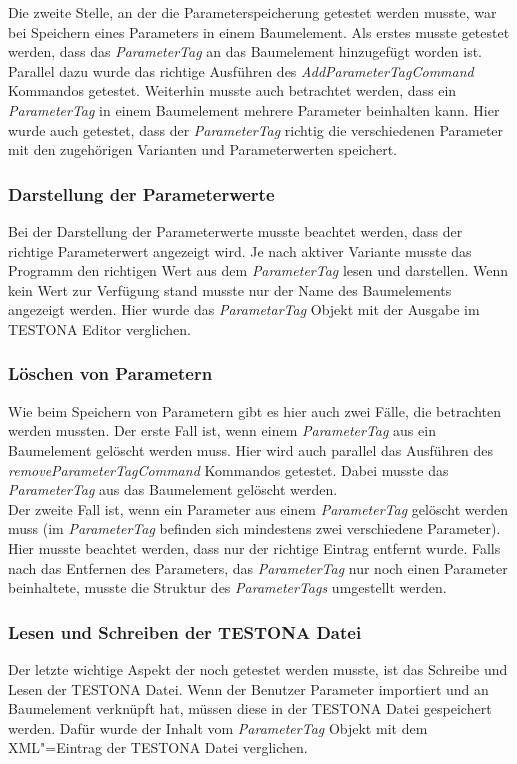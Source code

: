 Die zweite Stelle, an der die Parameterspeicherung getestet werden musste, war bei Speichern eines Parameters in einem Baumelement. Als erstes musste getestet werden, dass das \textit{ParameterTag} an das Baumelement hinzugefügt worden ist. Parallel dazu wurde das richtige Ausführen des \textit{AddParameterTagCommand} Kommandos getestet. Weiterhin musste auch betrachtet werden, dass ein \textit{ParameterTag} in einem Baumelement mehrere Parameter beinhalten kann. Hier wurde auch getestet, dass der \textit{ParameterTag} richtig die verschiedenen Parameter mit den zugehörigen Varianten und Parameterwerten speichert.\\



\subsubsection{Darstellung der Parameterwerte}
Bei der Darstellung der Parameterwerte musste beachtet werden, dass der richtige Parameterwert angezeigt wird. Je nach aktiver Variante musste das Programm den richtigen Wert aus dem \textit{ParameterTag} lesen und darstellen. Wenn kein Wert zur Verfügung stand musste nur der Name des Baumelements angezeigt werden. Hier wurde das \textit{ParametarTag} Objekt mit der Ausgabe im TESTONA Editor verglichen.\\


\subsubsection{Löschen von Parametern}
Wie beim Speichern von Parametern gibt es hier auch zwei Fälle, die betrachten werden mussten. Der erste Fall ist, wenn einem \textit{ParameterTag} aus ein Baumelement gelöscht werden muss. Hier wird auch parallel das Ausführen des \textit{removeParameterTagCommand} Kommandos getestet. Dabei musste das \textit{ParameterTag} aus das Baumelement gelöscht werden.\\


Der zweite Fall ist, wenn ein Parameter aus einem \textit{ParameterTag} gelöscht werden muss (im \textit{ParameterTag} befinden sich mindestens zwei verschiedene Parameter). Hier musste beachtet werden, dass nur der richtige Eintrag entfernt wurde. Falls nach das Entfernen des Parameters, das \textit{ParameterTag} nur noch einen Parameter beinhaltete, musste die Struktur des \textit{ParameterTags} umgestellt werden.\\


\subsubsection{Lesen und Schreiben der TESTONA Datei}
Der letzte wichtige Aspekt der noch getestet werden musste, ist das Schreibe und Lesen der TESTONA Datei. Wenn der Benutzer Parameter importiert und an Baumelement verknüpft hat, müssen diese in der TESTONA Datei gespeichert werden. Dafür wurde der Inhalt vom \textit{ParameterTag} Objekt mit dem XML"=Eintrag der TESTONA Datei verglichen.\\


